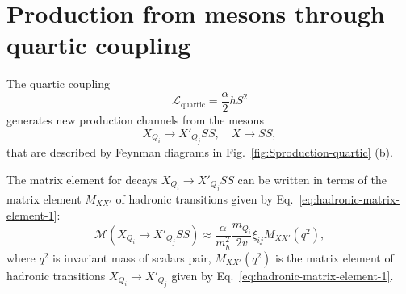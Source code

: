 \documentclass[a4paper,12pt,dvipsnames,usernames]{article}
\begin{document}
\section{Production from mesons through quartic coupling}
\label{sec:quartic-coupling}
The quartic coupling 
\begin{equation}
    \mathcal{L}_{\text{quartic}} = \frac{\alpha}{2}hS^{2}
    \label{eq:quartic-coupling}
\end{equation}
generates new production channels from the mesons
\begin{equation}
X_{Q_i} \to X'_{Q_j}SS, \quad X\to SS,
\label{eq:quartic-coupling-processes}
\end{equation}
that are described by Feynman diagrams in Fig.~\ref{fig:Sproduction-quartic} (b). 

The matrix element for decays $X_{Q_{i}}\to X'_{Q_{j}}SS$ can be written in terms of the matrix element $M_{XX'}$ of hadronic transitions given by Eq.~\eqref{eq:hadronic-matrix-element-1}:
\begin{equation}
    \mathcal{M}(X_{Q_{i}} \to X'_{Q_{j}}SS) \approx \frac{\alpha}{m_{h}^{2}}\frac{m_{Q_i}}{2v}\xi_{ij}M_{XX'}(q^{2}),
\end{equation}
where $q^{2}$ is invariant mass of scalars pair, $M_{XX'}(q^{2})$ is the matrix element of hadronic transitions $X_{Q_{i}} \to X'_{Q_{j}}$ given by Eq.~\eqref{eq:hadronic-matrix-element-1}.
\end{document}
